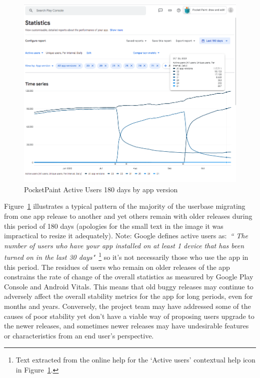 \begin{figure}[ht]
    \centering
    \includegraphics[width=15.5cm]{images/android-vitals-screenshots/PocketPaint-ActiveUsers-180days-2020-10-29.png}
    \caption{PocketPaint Active Users 180 days by app version}
    \label{fig:pocketpaint-180d-active-users}
\end{figure}

Figure~\ref{fig:pocketpaint-180d-active-users} illustrates a typical pattern of the majority of the userbase migrating from one app release to another and yet others remain with older releases during this period of 180 days (apologies for the small text in the image it was impractical to resize it adequately). Note: Google defines active users as:~\emph{``
The number of users who have your app installed on at least 1 device that has been turned on in the last 30 days"}~\footnote{Text extracted from the online help for the `Active users' contextual help icon in Figure~\ref{fig:pocketpaint-180d-active-users}.} so it's not necessarily those who use the app in this period. The residues of users who remain on older releases of the app constrains the rate of change of the overall statistics as measured by Google Play Console and Android Vitals. This means that old buggy releases may continue to adversely affect the overall stability metrics for the app for long periods, even for months and years. Conversely, the project team may have addressed some of the causes of poor stability yet don't have a viable way of proposing users upgrade to the newer releases, and sometimes newer releases may have undesirable features or characteristics from an end user's perspective.

